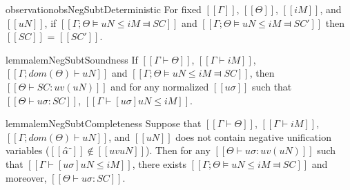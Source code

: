 \begin{restatable}{observation}{obsNegSubtDeterministic}
    \label{obs:neg-subt-deterministic}
    For fixed $[[Γ]]$, $[[Θ]]$, $[[iM]]$, and $[[uN]]$, 
    if $[[Γ ; Θ ⊨ uN ≤ iM ⫤ SC]]$ 
    and $[[Γ ; Θ ⊨ uN ≤ iM ⫤ SC']]$
    then $[[SC]]$ = $[[SC']]$.
\end{restatable}

\begin{restatable}{lemma}{lemNegSubtSoundness}
    \label{lemma:neg-subt-soundness}
    If $[[Γ ⊢ Θ]]$, $[[Γ ⊢ iM]]$, $[[Γ ; dom(Θ) ⊢ uN]]$ and 
    $[[Γ ; Θ ⊨ uN ≤ iM ⫤ SC]]$, then 
    $[[Θ ⊢ SC : uv(uN)]]$ and 
    for any normalized $[[uσ]]$ such that $[[ Θ  ⊢ uσ : SC ]]$,
    $[[ Γ ⊢ [uσ]uN ≤ iM ]]$.
\end{restatable}

\begin{restatable}{lemma}{lemNegSubtCompleteness}
    \label{lemma:neg-subt-completeness}
    Suppose that $[[Γ ⊢ Θ]]$, $[[Γ ⊢ iM]]$, $[[Γ ; dom(Θ) ⊢ uN]]$,
    and $[[uN]]$ does not contain negative unification variables ($[[α̂⁻]] \notin [[uv uN]]$).
    Then for any $[[Θ ⊢ uσ : uv(uN)]]$ such that $[[Γ ⊢ [uσ]uN ≤ iM]]$,
    there exists $[[Γ ; Θ ⊨ uN ≤ iM ⫤ SC]]$ and moreover, $[[ Θ ⊢ uσ : SC ]]$.
\end{restatable}
